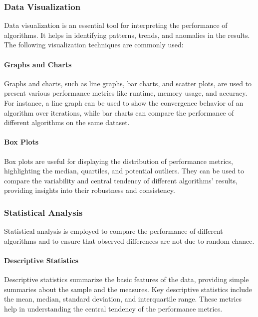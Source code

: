 \documentclass{article}
\begin{document}
    \subsubsection{Data Visualization}

    Data visualization is an essential tool for interpreting the performance of algorithms. It helps in identifying patterns, trends, and anomalies in the results. The following visualization techniques are commonly used:

    \paragraph{Graphs and Charts}

    Graphs and charts, such as line graphs, bar charts, and scatter plots, are used to present various performance metrics like runtime, memory usage, and accuracy. For instance, a line graph can be used to show the convergence behavior of an algorithm over iterations, while bar charts can compare the performance of different algorithms on the same dataset.

    \paragraph{Box Plots}

    Box plots are useful for displaying the distribution of performance metrics, highlighting the median, quartiles, and potential outliers. They can be used to compare the variability and central tendency of different algorithms' results, providing insights into their robustness and consistency.

    \subsubsection{Statistical Analysis}

    Statistical analysis is employed to compare the performance of different algorithms and to ensure that observed differences are not due to random chance.

    \paragraph{Descriptive Statistics}

    Descriptive statistics summarize the basic features of the data, providing simple summaries about the sample and the measures. Key descriptive statistics include the mean, median, standard deviation, and interquartile range. These metrics help in understanding the central tendency of the performance metrics.
\end{document}
